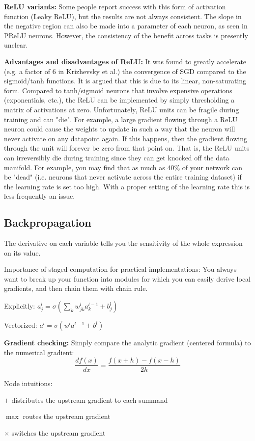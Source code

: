 \documentclass[12pt]{article}
\begin{document}
\par \textbf{ReLU variants:} Some people report success with this form of activation function (Leaky ReLU), but the results are not always consistent. The slope in the negative region can also be made into a parameter of each neuron, as seen in PReLU neurons. However, the consistency of the benefit across tasks is presently unclear.\\
\par \textbf{Advantages and disadvantages of ReLU:}
\ulb
\pro It was found to greatly accelerate (e.g. a factor of 6 in Krizhevsky et al.) the convergence of SGD compared to the sigmoid/tanh functions. It is argued that this is due to its linear, non-saturating form.
\pro Compared to tanh/sigmoid neurons that involve expensive operations (exponentials, etc.), the ReLU can be implemented by simply thresholding a matrix of activations at zero.
\con Unfortunately, ReLU units can be fragile during training and can "die". For example, a large gradient flowing through a ReLU neuron could cause the weights to update in such a way that the neuron will never activate on any datapoint again. If this happens, then the gradient flowing through the unit will forever be zero from that point on. That is, the ReLU units can irreversibly die during training since they can get knocked off the data manifold. For example, you may find that as much as 40\% of your network can be "dead" (i.e. neurons that never activate across the entire training dataset) if the learning rate is set too high. With a proper setting of the learning rate this is less frequently an issue.
\ule

\subsection{Backpropagation}
\par The derivative on each variable tells you the sensitivity of the whole expression on its value.
\par Importance of staged computation for practical implementations: You always want to break up your function into modules for which you can easily derive local gradients, and then chain them with chain rule.
\ulb
\item Explicitly: $a^{l}_j = \sigma\left( \sum_k w^{l}_{jk} a^{l-1}_k + b^l_j \right)$
\item Vectorized: $a^{l} = \sigma(w^l a^{l-1}+b^l)$
\ule
\par \textbf{Gradient checking:} Simply compare the analytic gradient (centered formula) to the numerical gradient:
\[ \frac{df(x)}{dx} = \frac{f(x+h) - f(x-h)}{2h} \]
\par Node intuitions:
\ulb
\item $+$ distributes the upstream gradient to each summand
\item $\max$ routes the upstream gradient
\item $\times$ switches the upstream gradient
\ule
\end{document}
